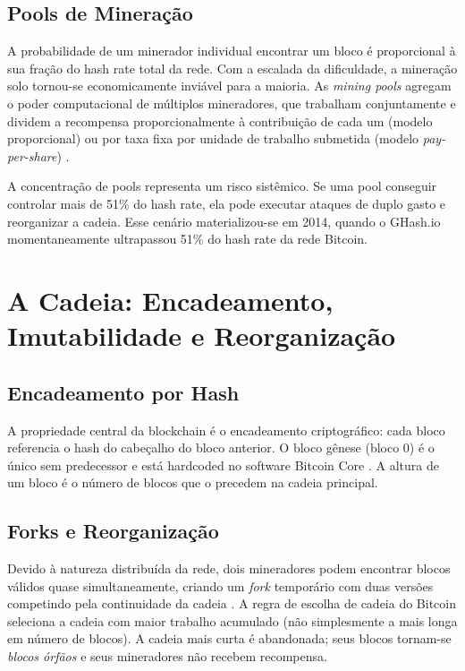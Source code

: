 \documentclass[12pt,a4paper]{report}
\begin{document}
\subsection{Pools de Mineração}

A probabilidade de um minerador individual encontrar um bloco é proporcional à sua fração do hash rate total da rede. Com a escalada da dificuldade, a mineração solo tornou-se economicamente inviável para a maioria. As \textit{mining pools} agregam o poder computacional de múltiplos mineradores, que trabalham conjuntamente e dividem a recompensa proporcionalmente à contribuição de cada um (modelo proporcional) ou por taxa fixa por unidade de trabalho submetida (modelo \textit{pay-per-share}) \cite{Bashir2023}.

A concentração de pools representa um risco sistêmico. Se uma pool conseguir controlar mais de 51\% do hash rate, ela pode executar ataques de duplo gasto e reorganizar a cadeia. Esse cenário materializou-se em 2014, quando o GHash.io momentaneamente ultrapassou 51\% do hash rate da rede Bitcoin.

\section{A Cadeia: Encadeamento, Imutabilidade e Reorganização}

\subsection{Encadeamento por Hash}

A propriedade central da blockchain é o encadeamento criptográfico: cada bloco referencia o hash do cabeçalho do bloco anterior. O bloco gênese (bloco 0) é o único sem predecessor e está hardcoded no software Bitcoin Core \cite{Bashir2023}. A altura de um bloco é o número de blocos que o precedem na cadeia principal.

\subsection{Forks e Reorganização}

Devido à natureza distribuída da rede, dois mineradores podem encontrar blocos válidos quase simultaneamente, criando um \textit{fork} temporário com duas versões competindo pela continuidade da cadeia \cite{Bashir2023}. A regra de escolha de cadeia do Bitcoin seleciona a cadeia com maior trabalho acumulado (não simplesmente a mais longa em número de blocos). A cadeia mais curta é abandonada; seus blocos tornam-se \textit{blocos órfãos} e seus mineradores não recebem recompensa.
\end{document}

